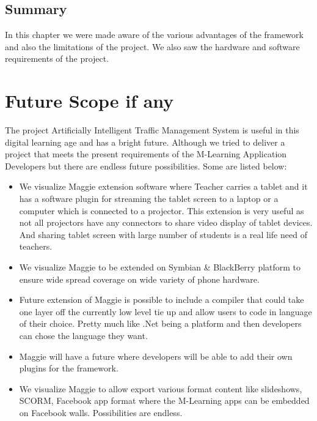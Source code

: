 \documentclass[openany,12pt]{report}
\begin{document}
\section{Summary}
\hspace*{0.5in}In this chapter we were made aware of the various advantages of the framework and also the limitations of the project. We also saw the hardware and software requirements of the project.
\chapter {Future Scope if any}

\hspace{0.5in}The project Artificially Intelligent Traffic Management System is useful in this digital learning age and has a bright future. Although we tried to deliver a project that meets the present requirements of the M-Learning Application Developers but there are endless future possibilities. Some are listed below:
\\
\begin{itemize}
\item{We visualize Maggie extension software where Teacher carries a tablet and it has a software plugin for streaming the tablet screen to a laptop or a computer which is connected to a projector. This extension is very useful as not all projectors have any connectors to share video display of tablet devices. And sharing tablet screen with large number of students is a real life need of teachers.}
\item{We visualize Maggie to be extended on Symbian \& BlackBerry platform to ensure wide spread coverage on wide variety of phone hardware.}
\item{Future extension of Maggie is possible to include a compiler that could take one layer off the currently low level tie up and allow users to code in language of their choice. Pretty much like .Net being a platform and then developers can chose the language they want.}
\item{Maggie will have a future where developers will be able to add their own plugins for the framework.}
\item{We visualize Maggie to allow export various format content like slideshows, SCORM, Facebook app format where the M-Learning apps can be embedded on Facebook walls. Possibilities are endless.}
\end{itemize}

\end{document}
